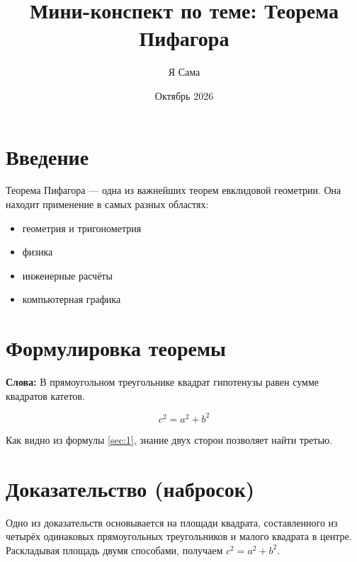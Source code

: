 \documentclass{article}
\title{Мини-конспект по теме: Теорема Пифагора}
\author{Я Сама}
\date{Октябрь 2026}
\begin{document}
\maketitle{}
\tableofcontents{}

\section{Введение}
Теорема Пифагора — одна из важнейших теорем евклидовой геометрии. Она находит
применение в самых разных областях:
\begin{itemize}
    \item геометрия и тригонометрия
    \item физика
    \item инженерные расчёты
    \item компьютерная графика
\end{itemize}
\section{Формулировка теоремы}
\textbf{Слова:} В прямоугольном треугольнике квадрат гипотенузы равен сумме квадратов
катетов.

\begin{equation}
c^2=a^2+b^2
    \label{sec:1}
\end{equation}
\begin{center}
 Как видно из формулы \ref{sec:1}, знание двух сторон позволяет найти третью.   
\end{center}
\section{Доказательство (набросок)}
\begin{flushleft}
    Одно из доказательств основывается на площади квадрата, составленного из четырёх одинаковых прямоугольных треугольников и малого квадрата в центре. Раскладывая площадь двумя способами, получаем $c^2=a^2+b^2$.
\end{flushleft}
\end{document}
